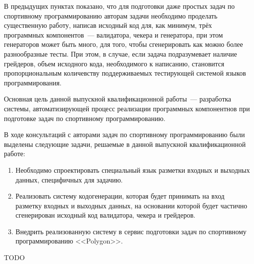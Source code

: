 \documentclass[times,specification,annotation]{style/itmo-student-thesis/itmo-student-thesis}
\begin{document}
В предыдущих пунктах показано, что для подготовки даже простых задач по спортивному программированию авторам задачи необходимо проделать существенную работу, написав исходный код для, как минимум, трёх программных компонентов~--- валидатора, чекера и генератора, при этом генераторов может быть много, для того, чтобы сгенерировать как можно более разнообразные тесты. При этом, в случае, если задача подразумевает наличие грейдеров, объем исходного кода, необходимого к написанию, становится пропорциональным количевству поддерживаемых тестирующей системой языков программирования.


Основная цель данной выпускной квалификационной работы~--- разработка системы, автоматизирующей процесс реализации программных компонентнов при подготовке задач по спортивному программированию.

В ходе консультаций с авторами задач по спортивному программированию были выделены следующие задачи, решаемые в данной выпускной квалификационной работе:

\begin{enumerate}
    \item Необходимо спроектировать специальный язык разметки входных и выходных данных, специфичных для задачию.
    \item Реализовать систему кодогенерации, которая будет принимать на вход разметку входных и выходных данных, на основании которой будет частично сгенерирован исходный код валидатора, чекера и грейдеров.
    \item Внедрить реализованную систему в сервис подготовки задач по спортивному программированию <<Polygon>>.
\end{enumerate}

\startconclusionpage

TODO

\printmainbibliography

\appendix
\end{document}
